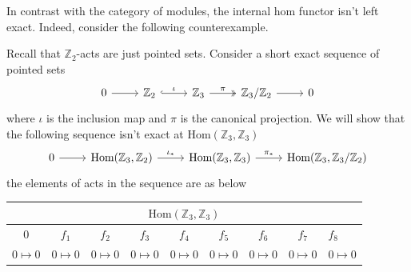 In contrast with the category of modules, the 
internal hom functor isn't left exact. Indeed, consider the following
counterexample.
\begin{counterexample}
    Recall that $\mathbb{Z}_2$-acts are just pointed sets. Consider a 
    short exact sequence of pointed sets
    \[\begin{tikzcd}
        0 & {\mathbb{Z}_2} & {\mathbb{Z}_3} & {\mathbb{Z}_3/\mathbb{Z}_2} & 0
        \arrow[from=1-1, to=1-2]
        \arrow["\iota", hook, from=1-2, to=1-3]
        \arrow["\pi", two heads, from=1-3, to=1-4]
        \arrow[from=1-4, to=1-5]
    \end{tikzcd}\]
    where $\iota$ is the inclusion map and $\pi$ is the canonical projection.
    We will show that the following sequence isn't exact at $\text{Hom}(\mathbb{Z}_3,\mathbb{Z}_3)$
    \[\begin{tikzcd}
        0 & {\text{Hom}(\mathbb{Z}_3,\mathbb{Z}_2)} & {\text{Hom}(\mathbb{Z}_3,\mathbb{Z}_3)} & {\text{Hom}(\mathbb{Z}_3,\mathbb{Z}_3/\mathbb{Z}_2)}
        \arrow[from=1-1, to=1-2]
        \arrow["{\iota_*}", from=1-2, to=1-3]
        \arrow["{\pi_*}", from=1-3, to=1-4]
    \end{tikzcd}\]
    the elements of acts in the sequence are as below
    \begin{table}[H]
        \centering
        \begin{tabular}{ccccccccc}
        \hline
        \multicolumn{9}{|c|}{$\text{Hom}(\mathbb{Z}_3,\mathbb{Z}_3)$}                                                                                                                                                                                                                                                                              \\ \hline
        \multicolumn{1}{|c|}{$0$}          & \multicolumn{1}{c|}{$f_1$}        & \multicolumn{1}{c|}{$f_2$}        & \multicolumn{1}{c|}{$f_3$}        & \multicolumn{1}{c|}{$f_4$}        & \multicolumn{1}{c|}{$f_5$}          & \multicolumn{1}{c|}{$f_6$}          & \multicolumn{1}{c|}{$f_7$}          & \multicolumn{1}{l|}{$f_8$}          \\ \hline
        \multicolumn{1}{|c|}{$0\mapsto 0$} & \multicolumn{1}{c|}{$0\mapsto 0$} & \multicolumn{1}{c|}{$0\mapsto 0$} & \multicolumn{1}{c|}{$0\mapsto 0$} & \multicolumn{1}{c|}{$0\mapsto 0$} & \multicolumn{1}{c|}{$0\mapsto 0$}   & \multicolumn{1}{c|}{$0\mapsto 0$}   & \multicolumn{1}{c|}{$0\mapsto 0$}   & \multicolumn{1}{c|}{$0\mapsto 0$}   \\ \hline

\end{tabular}
\end{table}
\end{counterexample}
